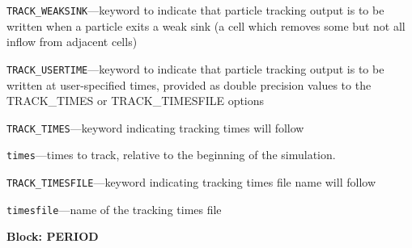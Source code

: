 \begin{description}
\item \texttt{TRACK\_WEAKSINK}---keyword to indicate that particle tracking output is to be written when a particle exits a weak sink (a cell which removes some but not all inflow from adjacent cells)

\item \texttt{TRACK\_USERTIME}---keyword to indicate that particle tracking output is to be written at user-specified times, provided as double precision values to the TRACK\_TIMES or TRACK\_TIMESFILE options

\item \texttt{TRACK\_TIMES}---keyword indicating tracking times will follow

\item \texttt{times}---times to track, relative to the beginning of the simulation.

\item \texttt{TRACK\_TIMESFILE}---keyword indicating tracking times file name will follow

\item \texttt{timesfile}---name of the tracking times file

\end{description}
\item \textbf{Block: PERIOD}

